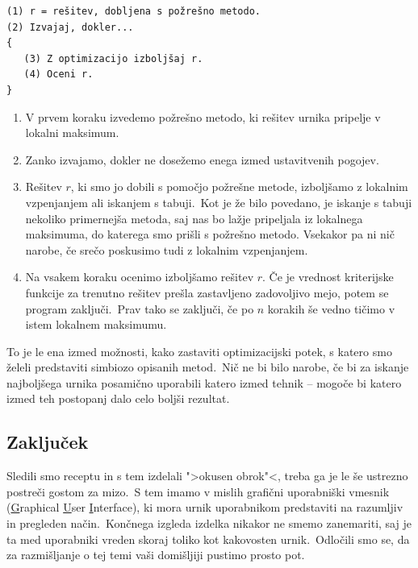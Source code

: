 \documentclass[a4paper,10pt]{article}
\begin{document}
\begin{verbatim}
(1) r = rešitev, dobljena s požrešno metodo.
(2) Izvajaj, dokler...
{
   (3) Z optimizacijo izboljšaj r.
   (4) Oceni r.
}
\end{verbatim}
\begin{enumerate}
   \item V prvem koraku izvedemo požrešno metodo, ki rešitev urnika pripelje v lokalni maksimum.

  \item Zanko izvajamo, dokler ne dosežemo enega izmed ustavitvenih pogojev.

  \item Rešitev \(r\), ki smo jo dobili s pomočjo požrešne metode, izboljšamo z lokalnim vzpenjanjem
   ali iskanjem s tabuji.\ Kot je že bilo povedano, je iskanje s tabuji nekoliko primernejša metoda,
   saj nas bo lažje pripeljala iz lokalnega maksimuma, do katerega smo prišli s požrešno metodo.
   Vsekakor pa ni nič narobe, če srečo poskusimo tudi z lokalnim vzpenjanjem.

   \item Na vsakem koraku ocenimo izboljšamo rešitev \(r\). Če je vrednost kriterijske funkcije
   za trenutno rešitev prešla zastavljeno zadovoljivo mejo, potem se program zaključi.\ Prav tako
   se zaključi, če po \(n\) korakih še vedno tičimo v istem lokalnem maksimumu.
\end{enumerate}
\noindent To je le ena izmed možnosti, kako zastaviti optimizacijski potek, s katero smo želeli predstaviti
simbiozo opisanih metod.\ Nič ne bi bilo narobe, če bi za iskanje najboljšega urnika posamično
uporabili katero izmed tehnik -- mogoče bi katero izmed teh postopanj dalo celo boljši rezultat.

\subsection{Zaključek}

Sledili smo receptu in s tem izdelali ">okusen obrok"<, treba ga je le še ustrezno postreči
gostom za mizo.\ S tem imamo v mislih grafični uporabniški vmesnik (\underline{G}raphical \underline{U}ser \underline{I}nterface), ki mora urnik uporabnikom predstaviti na razumljiv in
pregleden način.\ Končnega izgleda izdelka nikakor ne smemo zanemariti, saj je ta med uporabniki
vreden skoraj toliko kot kakovosten urnik.\ Odločili smo se, da za razmišljanje o tej temi vaši
domišljiji pustimo prosto pot.
\end{document}
